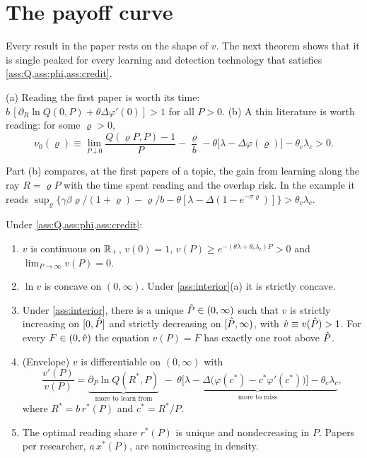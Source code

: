 \section{The payoff curve}\label{sec:payoff}

Every result in the paper rests on the shape of $v$. The next theorem shows
that it is single peaked for every learning and detection technology that
satisfies \cref{ass:Q,ass:phi,ass:credit}.

\begin{assumption}\label{ass:interior}
(a) Reading the first paper is worth its time: $b\,[\partial_R\ln Q(0,P)+\theta\Delta\varphi'(0)]>1$ for all $P>0$.
(b) A thin literature is worth reading: for some $\varrho>0$,
\[
\nu_0(\varrho)\equiv\lim_{P\downarrow 0}\frac{Q(\varrho P,P)-1}{P}-\frac{\varrho}{b}-\theta\big[\lambda-\Delta\varphi(\varrho)\big]-\theta_c\lambda_c>0.
\]
\end{assumption}

Part (b) compares, at the first papers of a topic, the gain from learning along
the ray $R=\varrho P$ with the time spent reading and the overlap risk. In the
example it reads $\sup_\varrho\{\gamma\beta\varrho/(1+\varrho)-\varrho/b-\theta[\lambda-\Delta(1-e^{-\sigma\varrho})]\}>\theta_c\lambda_c$.

\begin{theorem}\label{thm:v}
Under \cref{ass:Q,ass:phi,ass:credit}:
\begin{enumerate}[label=(\roman*)]
\item $v$ is continuous on $\mathbb{R}_+$, $v(0)=1$, $v(P)\ge e^{-(\theta\lambda+\theta_c\lambda_c)P}>0$ and $\lim_{P\to\infty}v(P)=0$.
\item $\ln v$ is concave on $(0,\infty)$. Under \cref{ass:interior}(a) it is strictly concave.
\item Under \cref{ass:interior}, there is a unique $\hat P\in(0,\infty)$ such that $v$ is strictly increasing on $[0,\hat P]$ and strictly decreasing on $[\hat P,\infty)$, with $\hat v\equiv v(\hat P)>1$. For every $F\in(0,\hat v)$ the equation $v(P)=F$ has exactly one root above $\hat P$.
\item (Envelope) $v$ is differentiable on $(0,\infty)$ with
\begin{equation}\label{eq:envelope}
\frac{v'(P)}{v(P)}=\underbrace{\partial_P\ln Q(R^*,P)}_{\text{more to learn from}}\;-\;\underbrace{\theta\big[\lambda-\Delta\big(\varphi(c^*)-c^*\varphi'(c^*)\big)\big]-\theta_c\lambda_c}_{\text{more to miss}},
\end{equation}
where $R^*=b\,r^*(P)$ and $c^*=R^*/P$.
\item The optimal reading share $r^*(P)$ is unique and nondecreasing in $P$. Papers per researcher, $a\,x^*(P)$, are nonincreasing in density.
\end{enumerate}
\end{theorem}

